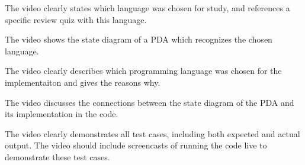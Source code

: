 \documentclass[12pt, oneside]{article}
\begin{document}
The video clearly states which language was chosen for study, 
and references a specific review quiz with this language.

The video shows the state diagram of a PDA which recognizes the 
chosen language.

The video clearly describes which programming language was chosen 
for the implementaiton and gives the reasons why.

The video discusses the connections between the state diagram of the PDA 
and its implementation in the code.

The video clearly demonstrates all test cases, including both expected
and actual output. The video should include screencasts of 
running the code live to demonstrate these test cases.
\end{document}

